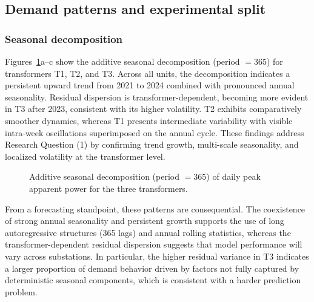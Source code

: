 \subsection{Demand patterns and experimental split}
\label{subsec:results_patterns_split}

\subsubsection{Seasonal decomposition}
Figures~\ref{fig:decomp_all}a--c show the additive seasonal decomposition (period $=365$) for transformers T1, T2, and T3. Across all units, the decomposition indicates a persistent upward trend from 2021 to 2024 combined with pronounced annual seasonality. Residual dispersion is transformer-dependent, becoming more evident in T3 after 2023, consistent with its higher volatility. T2 exhibits comparatively smoother dynamics, whereas T1 presents intermediate variability with visible intra-week oscillations superimposed on the annual cycle. These findings address Research Question (1) by confirming trend growth, multi-scale seasonality, and localized volatility at the transformer level.

\begin{figure}[!h]
\centering
\begin{subfigure}[t]{\columnwidth}
    \centering
    
\end{subfigure}\par\vspace{0.15cm}
\begin{subfigure}[t]{\columnwidth}
    \centering
    
\end{subfigure}\par\vspace{0.15cm}
\begin{subfigure}[t]{\columnwidth}
    \centering
    
\end{subfigure}
\caption{Additive seasonal decomposition (period $=365$) of daily peak apparent power for the three transformers.}
\label{fig:decomp_all}
\end{figure}

From a forecasting standpoint, these patterns are consequential. The coexistence of strong annual seasonality and persistent growth supports the use of long autoregressive structures (365 lags) and annual rolling statistics, whereas the transformer-dependent residual dispersion suggests that model performance will vary across substations. In particular, the higher residual variance in T3 indicates a larger proportion of demand behavior driven by factors not fully captured by deterministic seasonal components, which is consistent with a harder prediction problem.


